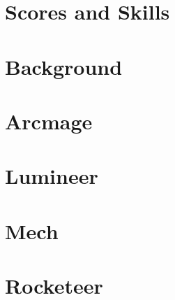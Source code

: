 \documentclass[a4paper]{article}
\begin{document}
\def\qeq#1#2#3#4#5#6#7#8#9{#1 ? 
\vspace*{-0.4cm} \begin{enumerate}[leftmargin=2cm]
\item [#2] #3 

\if#4%
\else
\item [#4] #5
\fi

\if#6%
\else
\item [#6] #7
\fi

\if#8%
\else
\item [#8] #9
\fi
\end{enumerate}}

\def\pbhw#1#2{
\begin{tabular}[t]{r p{14cm}}
\textit{Physical} - & #1 \\
\textit{Heating} - & #2 \\
\end{tabular}}

\section{Scores and Skills}

\section{Background}

\section{Arcmage}

\section{Lumineer}

\section{Mech}

\section{Rocketeer}
\end{document}
